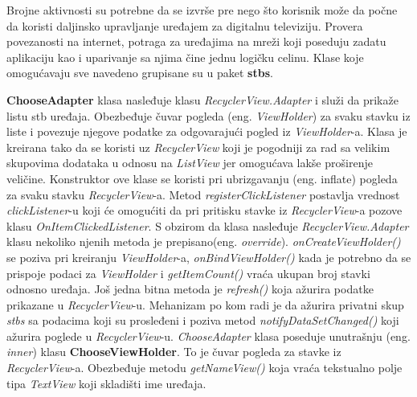 \documentclass[struktura.tex]{subfiles}
\begin{document}
Brojne aktivnosti su potrebne da se izvrše pre nego što korisnik može da počne da koristi daljinsko upravljanje uređajem za digitalnu televiziju. Provera povezanosti na internet, potraga za uređajima na mreži koji poseduju zadatu aplikaciju kao i uparivanje sa njima čine jednu logičku celinu. Klase koje omogućavaju sve navedeno grupisane su u paket \textbf{stbs}.

\textbf{ChooseAdapter} klasa nasleđuje klasu \textit{RecyclerView.Adapter} i služi da prikaže listu stb uređaja. Obezbeđuje čuvar pogleda (eng. \textit{ViewHolder}) za svaku stavku iz liste i povezuje njegove podatke za odgovarajući pogled iz \textit{ViewHolder}-a. Klasa je kreirana tako da se koristi uz \textit{RecyclerView} koji je pogodniji za rad sa velikim skupovima dodataka u odnosu na \textit{ListView} jer omogućava lakše proširenje veličine. Konstruktor ove klase se koristi pri ubrizgavanju (eng. inflate) pogleda za svaku stavku \textit{RecyclerView}-a. Metod \textit{registerClickListener} postavlja vrednost \textit{clickListener}-u koji će omogućiti da pri pritisku stavke iz \textit{RecyclerView}-a pozove klasu \textit{OnItemClickedListener}. S obzirom da klasa nasleđuje \textit{RecyclerView.Adapter} klasu nekoliko njenih metoda je  prepisano(eng. \textit{override}). \textit{onCreateViewHolder()} se poziva pri kreiranju \textit{ViewHolder}-a, \textit{onBindViewHolder()} kada je potrebno da se prispoje podaci za \textit{ViewHolder} i \textit{getItemCount()} vraća ukupan broj stavki odnosno uređaja. Još jedna bitna metoda je \textit{refresh()} koja ažurira podatke prikazane u \textit{RecyclerView}-u. Mehanizam po kom radi je da ažurira privatni skup \textit{stbs} sa podacima koji su prosleđeni i poziva metod \textit{notifyDataSetChanged()} koji ažurira poglede u \textit{RecyclerView}-u. \textit{ChooseAdapter} klasa poseduje unutrašnju (eng. \textit{inner}) klasu \textbf{ChooseViewHolder}. To je čuvar pogleda za stavke iz \textit{RecyclerView}-a. Obezbeđuje metodu \textit{getNameView()} koja vraća tekstualno polje tipa \textit{TextView} koji skladišti ime uređaja.
\end{document}
